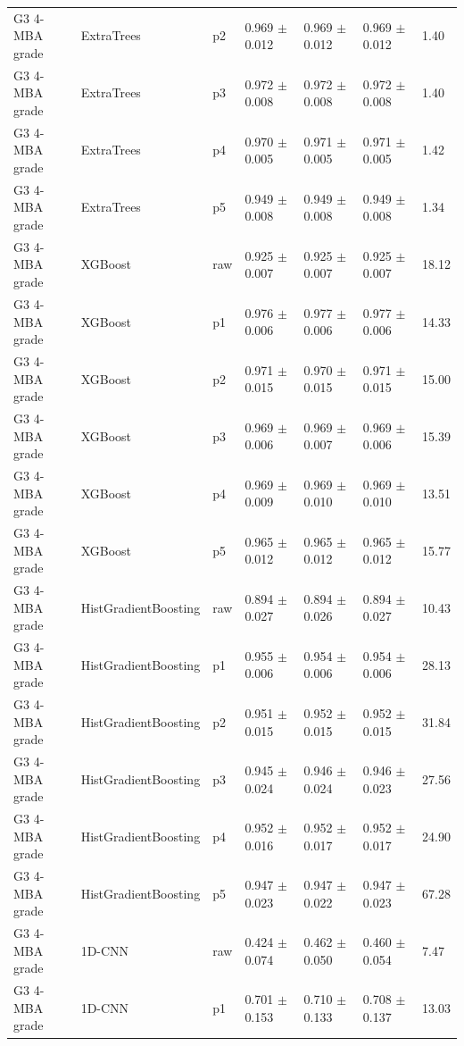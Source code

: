 {\begin{longtable}{L{2.35cm}L{2.4cm}L{1.0cm}L{2.35cm}L{2.25cm}L{2.25cm}L{1.45cm}}
G3 4-MBA grade & ExtraTrees & p2 & 0.969 $\pm$ 0.012 & 0.969 $\pm$ 0.012 & 0.969 $\pm$ 0.012 & 1.40 \\
G3 4-MBA grade & ExtraTrees & p3 & 0.972 $\pm$ 0.008 & 0.972 $\pm$ 0.008 & 0.972 $\pm$ 0.008 & 1.40 \\
G3 4-MBA grade & ExtraTrees & p4 & 0.970 $\pm$ 0.005 & 0.971 $\pm$ 0.005 & 0.971 $\pm$ 0.005 & 1.42 \\
G3 4-MBA grade & ExtraTrees & p5 & 0.949 $\pm$ 0.008 & 0.949 $\pm$ 0.008 & 0.949 $\pm$ 0.008 & 1.34 \\
G3 4-MBA grade & XGBoost & raw & 0.925 $\pm$ 0.007 & 0.925 $\pm$ 0.007 & 0.925 $\pm$ 0.007 & 18.12 \\
G3 4-MBA grade & XGBoost & p1 & 0.976 $\pm$ 0.006 & 0.977 $\pm$ 0.006 & 0.977 $\pm$ 0.006 & 14.33 \\
G3 4-MBA grade & XGBoost & p2 & 0.971 $\pm$ 0.015 & 0.970 $\pm$ 0.015 & 0.971 $\pm$ 0.015 & 15.00 \\
G3 4-MBA grade & XGBoost & p3 & 0.969 $\pm$ 0.006 & 0.969 $\pm$ 0.007 & 0.969 $\pm$ 0.006 & 15.39 \\
G3 4-MBA grade & XGBoost & p4 & 0.969 $\pm$ 0.009 & 0.969 $\pm$ 0.010 & 0.969 $\pm$ 0.010 & 13.51 \\
G3 4-MBA grade & XGBoost & p5 & 0.965 $\pm$ 0.012 & 0.965 $\pm$ 0.012 & 0.965 $\pm$ 0.012 & 15.77 \\
G3 4-MBA grade & HistGradientBoosting & raw & 0.894 $\pm$ 0.027 & 0.894 $\pm$ 0.026 & 0.894 $\pm$ 0.027 & 10.43 \\
G3 4-MBA grade & HistGradientBoosting & p1 & 0.955 $\pm$ 0.006 & 0.954 $\pm$ 0.006 & 0.954 $\pm$ 0.006 & 28.13 \\
G3 4-MBA grade & HistGradientBoosting & p2 & 0.951 $\pm$ 0.015 & 0.952 $\pm$ 0.015 & 0.952 $\pm$ 0.015 & 31.84 \\
G3 4-MBA grade & HistGradientBoosting & p3 & 0.945 $\pm$ 0.024 & 0.946 $\pm$ 0.024 & 0.946 $\pm$ 0.023 & 27.56 \\
G3 4-MBA grade & HistGradientBoosting & p4 & 0.952 $\pm$ 0.016 & 0.952 $\pm$ 0.017 & 0.952 $\pm$ 0.017 & 24.90 \\
G3 4-MBA grade & HistGradientBoosting & p5 & 0.947 $\pm$ 0.023 & 0.947 $\pm$ 0.022 & 0.947 $\pm$ 0.023 & 67.28 \\
G3 4-MBA grade & 1D-CNN & raw & 0.424 $\pm$ 0.074 & 0.462 $\pm$ 0.050 & 0.460 $\pm$ 0.054 & 7.47 \\
G3 4-MBA grade & 1D-CNN & p1 & 0.701 $\pm$ 0.153 & 0.710 $\pm$ 0.133 & 0.708 $\pm$ 0.137 & 13.03 \\

\end{longtable}}
